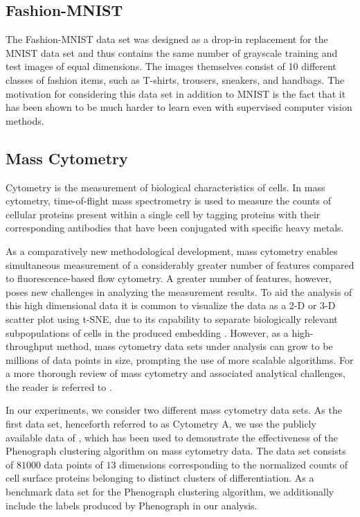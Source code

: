 \subsection{Fashion-MNIST}

The Fashion-MNIST data set \cite{fashion_mnist} was designed as a drop-in replacement for the MNIST data set and thus contains the same number of grayscale training and test images of equal dimensions. The images themselves consist of 10 different classes of fashion items, such as T-shirts, trousers, sneakers, and handbags. The motivation for considering this data set in addition to MNIST is the fact that it has been shown to be much harder to learn even with supervised computer vision methods.

\subsection{Mass Cytometry}

Cytometry is the measurement of biological characteristics of cells. In mass cytometry, time-of-flight mass spectrometry is used to measure the counts of cellular proteins present within a single cell by tagging proteins with their corresponding antibodies that have been conjugated with specific heavy metals.

As a comparatively new methodological development, mass cytometry enables simultaneous measurement of a considerably greater number of features compared to fluorescence-based flow cytometry. A greater number of features, however, poses new challenges in analyzing the measurement results. To aid the analysis of this high dimensional data it is common to visualize the data as a 2-D or 3-D scatter plot using t-SNE, due to its capability to separate biologically relevant subpopulations of cells in the produced embedding \citep{visne}. However, as a high-throughput method, mass cytometry data sets under analysis can grow to be millions of data points in size, prompting the use of more scalable algorithms. For a more thorough review of mass cytometry and associated analytical challenges, the reader is referred to \cite{mass_cytometry}.

In our experiments, we consider two different mass cytometry data sets. As the first data set, henceforth referred to as Cytometry A, we use the publicly available data of \cite{phenograph}, which has been used to demonstrate the effectiveness of the Phenograph clustering algorithm on mass cytometry data. The data set consists of $81000$ data points of $13$ dimensions corresponding to the normalized counts of cell surface proteins belonging to distinct clusters of differentiation. As a benchmark data set for the Phenograph clustering algorithm, we additionally include the labels produced by Phenograph in our analysis.

